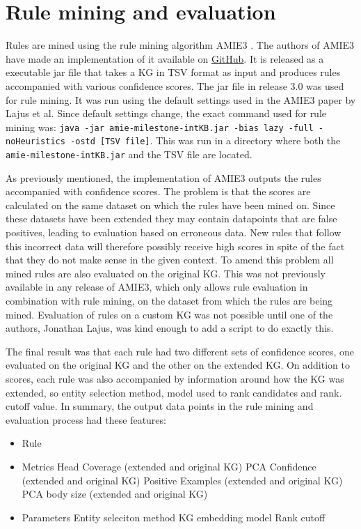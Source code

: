 \section{Rule mining and evaluation}
Rules are mined using the rule mining algorithm AMIE3 \cite{amie3}. The authors of AMIE3 have made an implementation of it available on \hyperlink{https://github.com/lajus/amie}{GitHub}. It is released as a executable jar file that takes a KG in TSV format as input and produces rules accompanied with various confidence scores. The jar file in release 3.0 was used for rule mining. It was run using the default settings used in the AMIE3 paper by Lajus et al\cite{amie3}. Since default settings change, the exact command used for rule mining was: \texttt{java -jar amie-milestone-intKB.jar -bias lazy -full -noHeuristics -ostd [TSV file]}. This was run in a directory where both the \texttt{amie-milestone-intKB.jar} and the TSV file are located.

As previously mentioned, the implementation of AMIE3 outputs the rules accompanied with confidence scores. The problem is that the scores are calculated on the same dataset on which the rules have been mined on. Since these datasets have been extended they may contain datapoints that are false positives, leading to evaluation based on erroneous data. New rules that follow this incorrect data will therefore possibly receive high scores in spite of the fact that they do not make sense in the given context. To amend this problem all mined rules are also evaluated on the original KG. This was not previously available in any release of AMIE3, which only allows rule evaluation in combination with rule mining, on the dataset from which the rules are being mined. Evaluation of rules on a custom KG was not possible until one of the authors, Jonathan Lajus, was kind enough to add a script to do exactly this.

The final result was that each rule had two different sets of confidence scores, one evaluated on the original KG and the other on the extended KG. On addition to scores, each rule was also accompanied by information around how the KG was extended, so entity selection method, model used to rank candidates and rank. cutoff value. In summary, the output data points in the rule mining and evaluation process had these features:
\begin{itemize}
    \item Rule
    \item Metrics
        \subitem Head Coverage (extended and original KG)
        \subitem PCA Confidence (extended and original KG)
        \subitem Positive Examples (extended and original KG)
        \subitem PCA body size (extended and original KG)
    \item Parameters
        \subitem Entity seleciton method
        \subitem KG embedding model
        \subitem Rank cutoff
\end{itemize}

